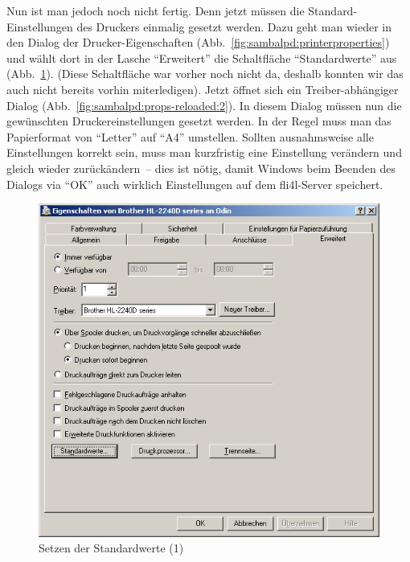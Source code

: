 Nun ist man jedoch noch nicht fertig. Denn jetzt müssen die
Standard-Einstellungen des Druckers einmalig gesetzt werden. Dazu geht man
wieder in den Dialog der Drucker-Eigenschaf\-ten
(Abb.~\ref{fig:sambalpd:printerproperties}) und wählt dort in der Lasche
``Erweitert'' die Schaltfläche ``Standardwerte'' aus
(Abb.~\ref{fig:sambalpd:props-reloaded:1}). (Diese Schaltfläche war vorher
noch nicht da, deshalb konnten wir das auch nicht bereits vorhin miterledigen).
Jetzt öffnet sich ein Treiber-abhängiger Dialog
(Abb.~\ref{fig:sambalpd:props-reloaded:2}). In diesem Dialog müssen nun die
gewünschten Druckereinstellungen gesetzt werden. In der Regel muss man das
Papierformat von ``Letter'' auf ``A4'' umstellen. Sollten ausnahmsweise alle
Einstellungen korrekt sein, muss man kurzfristig eine Einstellung verändern und
gleich wieder zurückändern~-- dies ist nötig, damit Windows beim Beenden des
Dialogs via ``OK'' auch wirklich Einstellungen auf dem fli4l-Server speichert.

\begin{figure}[hbt!]
\centering
\includegraphics[width=0.8\columnwidth]{image018}
\caption{Setzen der Standardwerte (1)}
\label{fig:sambalpd:props-reloaded:1}
\end{figure}

